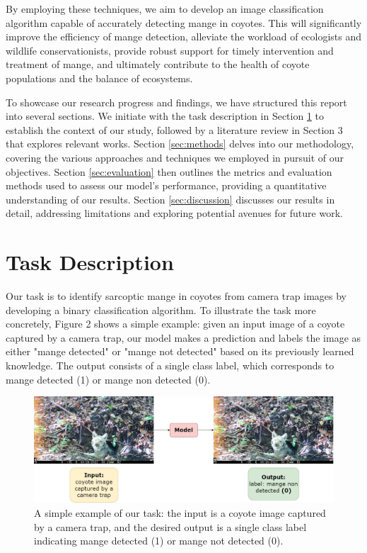 \documentclass{article}
\begin{document}
By employing these techniques, we aim to develop an image classification
algorithm capable of accurately detecting mange in coyotes. This will
significantly improve the efficiency of mange detection, alleviate the workload
of ecologists and wildlife conservationists, provide robust support for timely
intervention and treatment of mange, and ultimately contribute to the health of
coyote populations and the balance of ecosystems.

To showcase our research progress and findings, we have structured this report
into several sections. We initiate with the task description in Section
\ref{sec:task description} to
establish the context of our study, followed by a literature review in Section 3
that explores relevant works. Section \ref{sec:methods} delves into our methodology, covering
the various approaches and techniques we employed in pursuit of our objectives.
Section \ref{sec:evaluation} then outlines the metrics and evaluation methods used to assess our
model's performance, providing a quantitative understanding of our results.
Section \ref{sec:discussion} discusses our results in detail, addressing limitations and exploring
potential avenues for future work.

\section{Task Description} \label{sec:task description}
Our task is to identify sarcoptic mange in coyotes from camera trap images by
developing a binary classification algorithm. To illustrate the task more
concretely, Figure 2 shows a simple example: given an input image of a coyote
captured by a camera trap, our model makes a prediction and labels the image as
either "mange detected" or "mange not detected" based on its previously learned
knowledge. The output consists of a single class label, which corresponds to
mange detected (1) or mange non detected (0).

\begin{figure}
\centering
\includegraphics[width=1.0\textwidth]{fig2.jpeg}
\caption{\label{fig:fig2}A simple example of our task: the input is a coyote
image captured by a camera trap, and the desired output is a single class label
indicating mange detected (1) or mange not detected (0).}
\end{figure}
\end{document}
